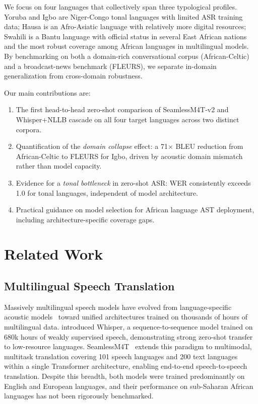 \documentclass[11pt,a4paper]{article}
\newcommand{\dataAC}{African-Celtic}
\newcommand{\dataFL}{FLEURS}
\begin{document}
We focus on four languages that collectively span three typological profiles. Yoruba and Igbo are Niger-Congo tonal languages with limited ASR training data; Hausa is an Afro-Asiatic language with relatively more digital resources; Swahili is a Bantu language with official status in several East African nations and the most robust coverage among African languages in multilingual models. By benchmarking on both a domain-rich conversational corpus (\dataAC{}) and a broadcast-news benchmark (\dataFL{}), we separate in-domain generalization from cross-domain robustness.

Our main contributions are:
\begin{enumerate}
  \item The first head-to-head zero-shot comparison of SeamlessM4T-v2 and Whisper+NLLB cascade on all four target languages across two distinct corpora.
  \item Quantification of the \emph{domain collapse} effect: a 71$\times$ BLEU reduction from \dataAC{} to \dataFL{} for Igbo, driven by acoustic domain mismatch rather than model capacity.
  \item Evidence for a \emph{tonal bottleneck} in zero-shot ASR: WER consistently exceeds 1.0 for tonal languages, independent of model architecture.
  \item Practical guidance on model selection for African language AST deployment, including architecture-specific coverage gaps.
\end{enumerate}

\section{Related Work}
\label{sec:related}

\subsection{Multilingual Speech Translation}
Massively multilingual speech models have evolved from language-specific acoustic models~\citep{povey2011kaldi} toward unified architectures trained on thousands of hours of multilingual data. \citet{radford2023whisper} introduced Whisper, a sequence-to-sequence model trained on 680k hours of weakly supervised speech, demonstrating strong zero-shot transfer to low-resource languages. SeamlessM4T~\citep{barrault2023seamlessm4t} extends this paradigm to multimodal, multitask translation covering 101 speech languages and 200 text languages within a single Transformer architecture, enabling end-to-end speech-to-speech translation. Despite this breadth, both models were trained predominantly on English and European languages, and their performance on sub-Saharan African languages has not been rigorously benchmarked.
\end{document}
